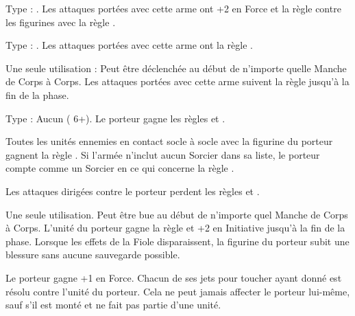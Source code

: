 \startarmymagicalitems

\armymagicalweapons

\startpricelist

Type : \hw{}. Les attaques portées avec cette arme ont +2 en Force et la règle  contre les figurines avec la règle \flammable{}.

Type : \hw{}. Les attaques portées avec cette arme ont la règle .

Une seule utilisation : Peut être déclenchée au début de n'importe quelle Manche de Corps à Corps. Les attaques portées avec cette arme suivent la règle \metalshifting{} jusqu'à la fin de la phase.

\endpricelist

\armymagicalarmour

\startpricelist

Type : Aucun (\armoursave{} 6+). Le porteur gagne les règles  et \fireborn{}.

\endpricelist

\armytalismans

\startpricelist

Toutes les unités ennemies en contact socle à socle avec la figurine du porteur gagnent la règle \flammable{}. Si l'armée n'inclut aucun Sorcier dans sa liste, le porteur compte comme un Sorcier en ce qui concerne la règle \shacklesoffire{}.

Les attaques dirigées contre le porteur perdent les règles \poisonedattacks{} et .

\endpricelist

\armyenchanteditems

\startpricelist

Une seule utilisation. Peut être bue au début de n'importe quel Manche de Corps à Corps. L'unité du porteur gagne la règle \lightningreflexes{} et +2 en Initiative jusqu'à la fin de la phase. Lorsque les effets de la Fiole disparaissent, la figurine du porteur subit une blessure sans aucune sauvegarde possible.

Le porteur gagne +1 en Force. Chacun de ses jets pour toucher ayant donné  est résolu contre l'unité du porteur. Cela ne peut jamais affecter le porteur lui-même, sauf s'il est monté et ne fait pas partie d'une unité.

